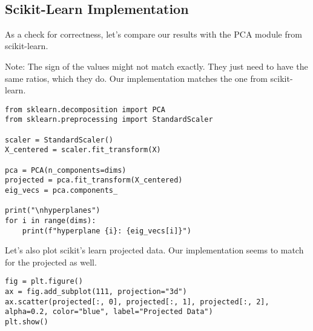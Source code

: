 \documentclass[openany]{book}
\begin{document}
    \begin{center}
    \end{center}
    { \hspace*{\fill} \\}

    \subsection{Scikit-Learn
Implementation}\label{scikit-learn-implementation}

As a check for correctness, let's compare our results with the PCA
module from scikit-learn.

Note: The sign of the values might not match exactly. They just need to
have the same ratios, which they do. Our implementation matches the one
from scikit-learn.

\begin{tcolorbox}
\tiny
\begin{verbatim}
from sklearn.decomposition import PCA
from sklearn.preprocessing import StandardScaler

scaler = StandardScaler()
X_centered = scaler.fit_transform(X)

pca = PCA(n_components=dims)
projected = pca.fit_transform(X_centered)
eig_vecs = pca.components_

print("\nhyperplanes")
for i in range(dims):
    print(f"hyperplane {i}: {eig_vecs[i]}")
\end{verbatim}
\end{tcolorbox}

    Let's also plot scikit's learn projected data. Our implementation seems
to match for the projected as well.

\begin{tcolorbox}
\tiny
\begin{verbatim}
fig = plt.figure()
ax = fig.add_subplot(111, projection="3d")
ax.scatter(projected[:, 0], projected[:, 1], projected[:, 2], alpha=0.2, color="blue", label="Projected Data")
plt.show()
\end{verbatim}
\end{tcolorbox}

    \begin{center}
    \end{center}
    { \hspace*{\fill} \\}
    
\end{document}
